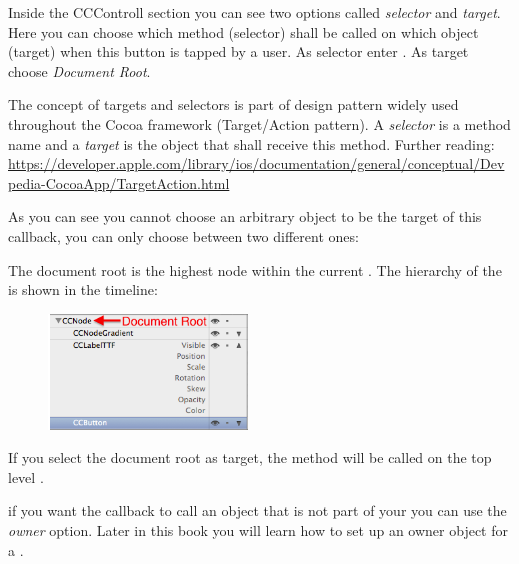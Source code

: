 Inside the CCControll section you can see two options called \textit{selector}
and \textit{target}. Here you can choose which method (selector) shall be
called on which object (target) when this button is tapped by a user. As
selector enter . As target choose \textit{Document Root}.

\begin{details}[frametitle={Targets and Selectors}] 
The concept of targets and selectors is part of design pattern widely used
throughout the Cocoa framework (Target/Action pattern). A \textit{selector} is
a method name and a \textit{target} is the object that shall receive this method.
Further reading:
\url{https://developer.apple.com/library/ios/documentation/general/conceptual/Devpedia-CocoaApp/TargetAction.html}
\end{details}

As you can see you cannot choose an arbitrary object to be the target of this
callback, you can only choose between two different ones:
\begin{description}\label{DocumentRoot_Owner}
\item[Document Root] The document root is the highest node
within the current \ccbfile{}. The hierarchy of the \ccbfile{} is shown in the
\SB{} timeline: \begin{figure}[H]
		\centering
		\includegraphics[width=150pt]{images/firstproject/documentroot_node.png}
\end{figure}
If you select the document root as target, the  method
will be called on the top level \ccnode{}. 
\item[Owner] if you want the callback to call an object that is not part of your
\ccbfile{} you can use the \textit{owner} option. Later in this book you will
learn how to set up an owner object for a \ccbfile{}.
\end{description}

